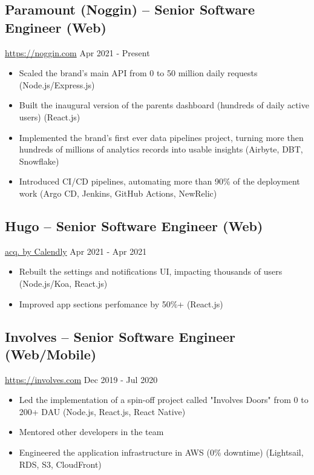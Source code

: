\documentclass[11pt, a4paper]{article}
\begin{document}
\subsection*{Paramount (Noggin) -- Senior Software Engineer (Web)}
\href{https://www.noggin.com}{https://noggin.com} \hfill Apr 2021 - Present
\begin{itemize}[noitemsep]
    \item Scaled the brand's main API from 0 to 50 million daily requests (Node.js/Express.js)
    \item Built the inaugural version of the parents dashboard (hundreds of daily active users) (React.js)
    \item Implemented the brand's first ever data pipelines project, turning more then hundreds of millions of analytics records into usable insights (Airbyte, DBT, Snowflake)
    \item Introduced CI/CD pipelines, automating more than 90\% of the deployment work (Argo CD, Jenkins, GitHub Actions, NewRelic)
\end{itemize}

\subsection*{Hugo -- Senior Software Engineer (Web)}
\href{https://www.linkedin.com/company/hugo-team/}{acq. by Calendly} \hfill Apr 2021 - Apr 2021
\begin{itemize}[noitemsep]
    \item Rebuilt the settings and notifications UI, impacting thousands of users (Node.js/Koa, React.js)
    \item Improved app sections perfomance by 50\%+ (React.js)
\end{itemize}

\subsection*{Involves -- Senior Software Engineer (Web/Mobile)}
\href{https://involves.com/}{https://involves.com} \hfill Dec 2019 - Jul 2020
\begin{itemize}[noitemsep]
    \item Led the implementation of a spin-off project called "Involves Doors" from 0 to 200+ DAU (Node.js, React.js, React Native)
    \item Mentored other developers in the team
    \item Engineered the application infrastructure in AWS (0\% downtime) (Lightsail, RDS, S3, CloudFront)
\end{itemize}
\end{document}
